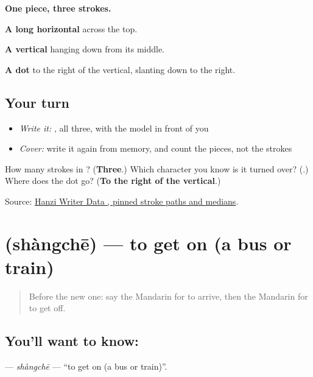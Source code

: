 \begin{quote}
\end{quote}

\textbf{One piece, three strokes.}

\textbf{A long horizontal} across the top.

\textbf{A vertical} hanging down from its middle.

\textbf{A dot} to the right of the vertical, slanting down to the right.

\subsection*{Your turn}
\begin{itemize}
\raggedright
  \item \emph{Write it:} , all three, with the model in front of you
  \item \emph{Cover:} write it again from memory, and count the pieces, not the strokes
\end{itemize}

\begin{tcolorbox}[breakable,colback=teal!4,colframe=teal!35!black,title={Before you move on}]
How many strokes in ? (\textbf{Three}.) Which character you know is it turned over? (\textbf{}.) Where does the dot go? (\textbf{To the right of the vertical}.)

Source: \href{https://raw.githubusercontent.com/chanind/hanzi-writer-data/68d10a4b21150cae5e1ebbd223eed289cf32d90c/data/\%E4\%B8\%8B.json}{Hanzi Writer Data , pinned stroke paths and medians}.
\end{tcolorbox}
\section[\texorpdfstring{\zh{上车} (shàngchē)}{上车 (shàngchē)}]{ (shàngchē) — to get on (a bus or train)}

\label{lesson:ZH-C73-shangche}



\begin{quote}
Before the new one: say the Mandarin for to arrive, then the Mandarin for to get off.
\end{quote}

\subsection*{You'll want to know: }
\textbf{} — \emph{shàngchē} — \textquotedblleft{}to get on (a bus or train)\textquotedblright{}.

